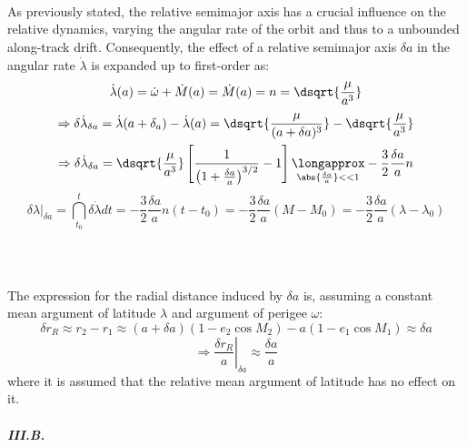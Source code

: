 			\paragraph{  \\}
			\indent As previously stated, the relative semimajor axis has a crucial influence on the relative dynamics, varying the angular rate of the orbit and thus to a unbounded along-track drift. Consequently, the effect of a relative semimajor axis $\delta a$ in the angular rate $\dot{\lambda}$ is expanded up to first-order as:
			\[
			\begin{array}{ccc}
			\dot{\lambda}(a) = \dot{\omega} + \dot{M}(a) = \dot{M}(a) = n = \dsqrt{\dfrac{\mu}{a^3}}\\[1em]
			\Rightarrow \delta\dot{\lambda}_{\delta a} = \dot{\lambda}(a + \delta_a) - \dot{\lambda}(a) =\dsqrt{\dfrac{\mu}{(a + \delta a)^3}} - \dsqrt{\dfrac{\mu}{a^3}}  \\[1em]
			\Rightarrow \delta\dot{\lambda}_{\delta a}= \dsqrt{\dfrac{\mu}{a^3}}\left[ \dfrac{1}{\left(1 + \frac{\delta a}{a}\right)^{3/2}} - 1\right] \underset{\tiny{\abs{\frac{\delta a}{a}}<<1}}{\longapprox} - \dfrac{3}{2}\dfrac{\delta a}{a} n
			\end{array}
			\]
			\begin{equation}
			\label{eqCh2:dLambda} \delta \lambda\rvert_{\delta a} = \dint_{t_0}^{t} \delta \dot{\lambda} dt = - \dfrac{3}{2}\dfrac{\delta a}{a} n (t - t_0) = - \dfrac{3}{2}\dfrac{\delta a}{a} (M - M_0) = - \dfrac{3}{2}\dfrac{\delta a}{a} (\lambda - \lambda_0)
			\end{equation}
			\subparagraph{  \\}
			\indent The expression for the radial distance induced by $\delta a$ is, assuming a constant mean argument of latitude $\lambda$ and argument of perigee $\omega$:
			\[
			\delta r_R \approx r_2 - r_1 \approx (a + \delta a) (1 - e_2 \cos M_2) - a (1 - e_1 \cos M_1) \approx \delta a
			\]
			\begin{equation}
			\label{eqCh2:r_R_a} \Rightarrow \left.\dfrac{\delta r_R}{a}\right\rvert_{\delta a} \approx \dfrac{\delta a}{a}
			\end{equation}
			\noindent where it is assumed that the relative mean argument of latitude has no effect on it.
			\subparagraph{\textcolor{GMVred}{III.B.} \\}
